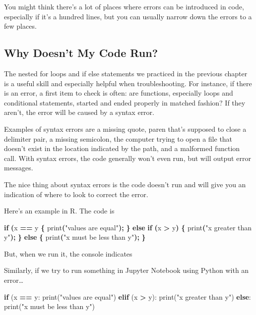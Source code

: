 \documentclass[
]{book}
\newenvironment{Shaded}{\begin{snugshade}}{\end{snugshade}}
\newcommand{\BuiltInTok}[1]{#1}
\newcommand{\ControlFlowTok}[1]{\textcolor[rgb]{0.13,0.29,0.53}{\textbf{#1}}}
\newcommand{\NormalTok}[1]{#1}
\newcommand{\OperatorTok}[1]{\textcolor[rgb]{0.81,0.36,0.00}{\textbf{#1}}}
\newcommand{\StringTok}[1]{\textcolor[rgb]{0.31,0.60,0.02}{#1}}
\begin{document}
You might think there's a lot of places where errors can be introduced in code,
especially if it's a hundred lines, but you can usually narrow down the errors
to a few places.

\subsection{Why Doesn't My Code Run?}\label{why-doesnt-my-code-run}

The nested for loops and if else statements we practiced in the previous chapter is a useful skill and especially helpful when troubleshooting. For instance, if there is an error, a first item to check is often: are functions, especially loops and conditional statements, started and ended properly in matched fashion? If they aren't, the error will be caused by a syntax error.

Examples of syntax errors are a missing quote, paren that's supposed to close a delimiter pair, a
missing semicolon, the computer trying to open a file that doesn't exist in
the location indicated by the path, and a malformed function call. With syntax errors, the
code generally won't even run, but will output error messages.

The nice thing about syntax errors is the code doesn't run and will give
you an indication of where to look to correct the error.

Here's an example in R. The code is

\begin{Shaded}
\begin{Highlighting}[]
\ControlFlowTok{if} \OperatorTok{(}\NormalTok{x }\OperatorTok{==}\NormalTok{ y }\OperatorTok{\{}
\NormalTok{  print}\OperatorTok{(}\StringTok{"values are equal"}\OperatorTok{);}
\OperatorTok{\}} \ControlFlowTok{else} \ControlFlowTok{if} \OperatorTok{(}\NormalTok{x }\OperatorTok{\textgreater{}}\NormalTok{ y}\OperatorTok{)} \OperatorTok{\{}
\NormalTok{  print}\OperatorTok{(}\StringTok{"x greater than y"}\OperatorTok{);}
\OperatorTok{\}} \ControlFlowTok{else} \OperatorTok{\{}
\NormalTok{  print}\OperatorTok{(}\StringTok{"x must be less than y"}\OperatorTok{);}
\OperatorTok{\}}
\end{Highlighting}
\end{Shaded}

But, when we run it, the console indicates

Similarly, if we try to run something in Jupyter Notebook using Python with an error\ldots{}

\begin{Shaded}
\begin{Highlighting}[]
\ControlFlowTok{if}\NormalTok{ (x }\OperatorTok{==}\NormalTok{ y:}
  \BuiltInTok{print}\NormalTok{(}\StringTok{"values are equal"}\NormalTok{)}
\ControlFlowTok{elif}\NormalTok{ (x }\OperatorTok{\textgreater{}}\NormalTok{ y):}
  \BuiltInTok{print}\NormalTok{(}\StringTok{"x greater than y"}\NormalTok{)}
\ControlFlowTok{else}\NormalTok{:}
  \BuiltInTok{print}\NormalTok{(}\StringTok{"x must be less than y"}\NormalTok{)}
\end{Highlighting}
\end{Shaded}
\end{document}
